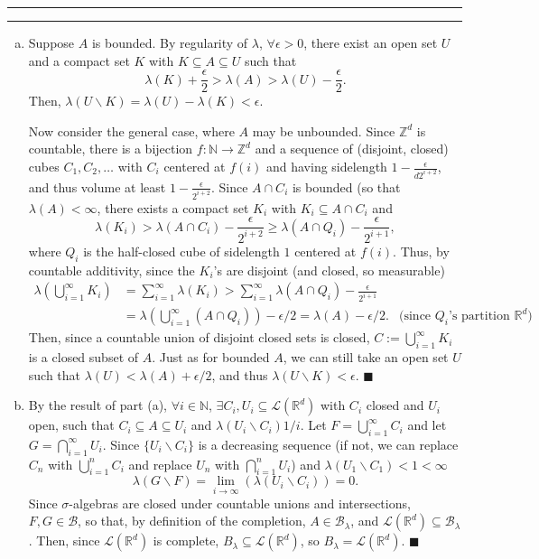 \documentclass[11pt]{article}
\newcounter{questionCounter}
\newcounter{partCounter}[questionCounter]
\newenvironment{question}[2][\arabic{questionCounter}]{%
    \setcounter{partCounter}{0}%
    \vspace{.25in} \hrule \vspace{0.5em}%
        \noindent{\bf #2}%
    \vspace{0.8em} \hrule \vspace{.10in}%
    \addtocounter{questionCounter}{1}%
}{}
\renewcommand{\qed}{\quad $\blacksquare$}
\newcommand{\sminus}{\backslash}
\newcommand{\N}{\mathbb{N}} %
\newcommand{\Z}{\mathbb{Z}} %
\newcommand{\R}{\mathbb{R}} %
\newcommand{\LRd}{\mathcal{L}\left(\R^d\right)} %
\newcommand{\B}{\mathcal{B}} %
\begin{document}
\begin{question}{Problem 2}
\begin{enumerate}[(a)]
\item Suppose $A$ is bounded. By regularity of
$\lambda$, $\forall \epsilon > 0$, there exist an open set $U$ and a compact
set $K$ with $K \subseteq A \subseteq U$ such that
\[\lambda(K) + \frac{\epsilon}{2} > \lambda(A) > \lambda(U) - \frac{\epsilon}{2}.\]
Then, $\lambda(U \sminus K) = \lambda(U) - \lambda(K) < \epsilon$.

Now consider the general case, where $A$ may be unbounded.
Since $\Z^d$ is countable, there is a bijection $f: \N \rightarrow \Z^d$ and a
sequence of (disjoint, closed) cubes $C_1,C_2,\ldots$ with $C_i$ centered at
$f(i)$ and having sidelength $1 - \frac{\epsilon}{d2^{i + 2}}$, and thus
volume at least $1 - \frac{\epsilon}{2^{i + 2}}$. Since $A \cap C_i$ is
bounded (so that $\lambda(A) < \infty$, there exists a compact set $K_i$ with
$K_i \subseteq A \cap C_i$ and
\[\lambda(K_i)
 > \lambda(A \cap C_i) - \frac{\epsilon}{2^{i + 2}}
 \geq \lambda(A \cap Q_i) - \frac{\epsilon}{2^{i + 1}},\]
where $Q_i$ is the half-closed cube of sidelength $1$ centered at $f(i)$. Thus, by
countable additivity, since the $K_i$'s are disjoint (and closed, so
measurable)
\begin{align*}
\lambda\left( \bigcup_{i = 1}^{\infty} K_i \right)
 & = \sum_{i = 1}^{\infty} \lambda(K_i)
   > \sum_{i = 1}^{\infty} \lambda(A \cap Q_i) - \frac{\epsilon}{2^{i + 1}} \\
 & = \lambda\left( \bigcup_{i = 1}^{\infty} (A \cap Q_i) \right) - \epsilon/2
   = \lambda(A) - \epsilon/2.        & \mbox{(since $Q_i$'s partition $\R^d$)}
\end{align*}
Then, since a countable union of disjoint closed sets is closed,
$C := \bigcup_{i = 1}^{\infty} K_i$ is a closed subset of $A$. Just as for bounded
$A$, we can still take an open set $U$ such that
$\lambda(U) < \lambda(A) + \epsilon/2$, and thus
$\lambda(U \sminus K) < \epsilon$. \qed

\item By the result of part (a), $\forall i \in \N$,
$\exists C_i,U_i \subseteq \LRd$ with $C_i$ closed and $U_i$ open, such that
$C_i \subseteq A \subseteq U_i$ and $\lambda(U_i \sminus C_i) 1/i$. Let
$F = \bigcup_{i = 1}^{\infty} C_i$ and let $G = \bigcap_{i = 1}^{\infty} U_i$.
Since $\{U_i \sminus C_i\}$ is a decreasing sequence (if not, we can replace
$C_n$ with $\bigcup_{i = 1}^n C_i$ and replace $U_n$ with
$\bigcap_{i = 1}^n U_i$) and $\lambda(U_1 \sminus C_1) < 1 < \infty$
\[\lambda(G \sminus F)
 = \lim_{i \rightarrow \infty} (\lambda(U_i \sminus C_i)) = 0.\]
Since $\sigma$-algebras are closed under countable unions and intersections,
$F,G \in \B$, so that, by definition of the completion, $A \in \B_{\lambda}$,
and $\LRd \subseteq \B_{\lambda}$. Then, since $\LRd$ is complete,
$B_{\lambda} \subseteq \LRd$, so $B_{\lambda} = \LRd$. \qed

\end{enumerate}
\end{question}
\end{document}
